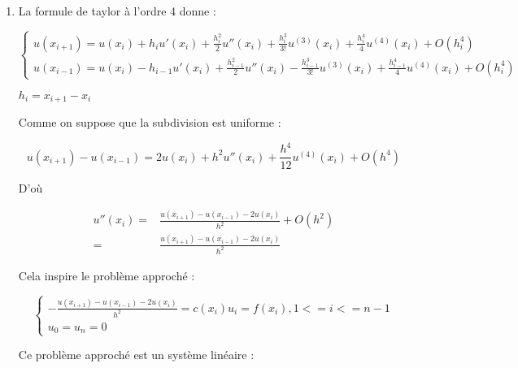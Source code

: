 \documentclass[12pt, letterpaper]{article}
\begin{document}
\begin{enumerate}
\item La formule de taylor à l'ordre 4 donne :

  \begin{equation*}
    \left\{
    \begin{array}{l}
      u(x_{i+1}) = u(x_i) + h_i u'(x_i) + \frac{h_i^2}{2} u''(x_i) +
      \frac{h_i^3}{3!} u^{(3)}(x_i) + \frac{h_i^4}{4} u^{(4)}(x_i) +
      O(h_i^4) \\
      u(x_{i-1}) = u(x_i) - h_{i-1} u'(x_i) + \frac{h_{i-1}^2}{2} u''(x_i) -
      \frac{h_{i-1}^3}{3!} u^{(3)}(x_i) + \frac{h_{i-1}^4}{4} u^{(4)}(x_i) + O(h_i^4)
    \end{array}
    \right.
  \end{equation*}

  $h_i = x_{i+1} - x_i$

  Comme on suppose que la subdivision est uniforme :

  \begin{equation*}
      u(x_{i+1}) - u(x_{i-1}) = 2 u(x_i) + h^2 u''(x_i) + \frac{h^4}{12}
      u^{(4)}(x_i) + O(h^4)
  \end{equation*}

  D'où

  \begin{equation*}
    \begin{split}
      u''(x_i) = & \frac{u(x_{i+1}) - u(x_{i-1}) - 2 u(x_i)}{h^2} +
      O(h^2) \\
      = & \frac{u(x_{i+1}) - u(x_{i-1}) - 2 u(x_i)}{h^2}
    \end{split}
  \end{equation*}

  Cela inspire le problème approché :

  \begin{equation*}
    \left\{
    \begin{array}{l}
      - \frac{u(x_{i+1}) - u(x_{i-1}) - 2 u(x_i)}{h^2} = c(x_i) u_i =
      f(x_i), 1 <= i <= n-1 \\
      u_0 = u_n = 0
    \end{array}
    \right.
  \end{equation*}

  Ce problème approché est un système linéaire :


\end{enumerate}
\end{document}
